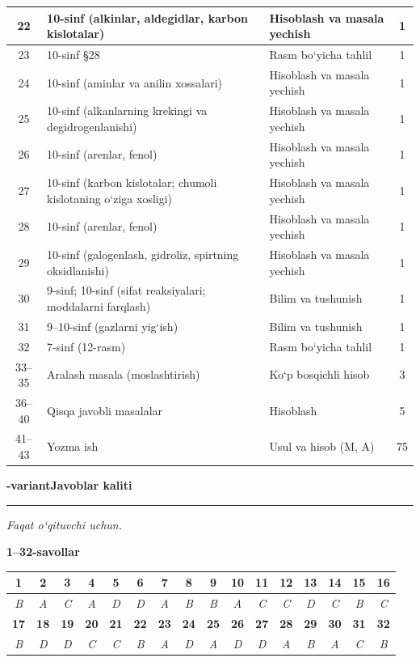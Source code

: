 \documentclass[11pt,a4paper]{article}
\newcommand{\hdrpill}[1]{\begin{tikzpicture}[baseline=0pt]\node[fill=ygreen,text=white,rounded corners=8pt,inner xsep=10pt,inner ysep=5pt,font=\fontsize{13}{15}\bfseries\selectfont] at (0,0.475){#1};\end{tikzpicture}}
\newcommand{\curvar}{}\fancyhead[R]{\hdrpill{\curvar}}
\begin{document}
{\begin{longtable}{|c|p{7.2cm}|p{5.4cm}|c|}
22 & 10-sinf (alkinlar, aldegidlar, karbon kislotalar) & Hisoblash va masala yechish & 1\\\hline
23 & 10-sinf \S{}28 & Rasm bo`yicha tahlil & 1\\\hline
24 & 10-sinf (aminlar va anilin xossalari) & Hisoblash va masala yechish & 1\\\hline
25 & 10-sinf (alkanlarning krekingi va degidrogenlanishi) & Hisoblash va masala yechish & 1\\\hline
26 & 10-sinf (arenlar, fenol) & Hisoblash va masala yechish & 1\\\hline
27 & 10-sinf (karbon kislotalar; chumoli kislotaning o`ziga xosligi) & Hisoblash va masala yechish & 1\\\hline
28 & 10-sinf (arenlar, fenol) & Hisoblash va masala yechish & 1\\\hline
29 & 10-sinf (galogenlash, gidroliz, spirtning oksidlanishi) & Hisoblash va masala yechish & 1\\\hline
30 & 9-sinf; 10-sinf (sifat reaksiyalari; moddalarni farqlash) & Bilim va tushunish & 1\\\hline
31 & 9--10-sinf (gazlarni yig`ish) & Bilim va tushunish & 1\\\hline
32 & 7-sinf (12-rasm) & Rasm bo`yicha tahlil & 1\\\hline
33--35 & Aralash masala (moslashtirish) & Ko`p bosqichli hisob & 3\\\hline
36--40 & Qisqa javobli masalalar & Hisoblash & 5\\\hline
41--43 & Yozma ish & Usul va hisob (M, A) & 75\\\hline
\end{longtable}}
\renewcommand{\curvar}{Javoblar}
\newpage
\noindent\textbf{\fontsize{13}{15}-variant}\hfill \textbf{Javoblar kaliti}\par\smallskip\hrule\smallskip
\textit{Faqat o`qituvchi uchun.}\par\medskip
\noindent\textbf{1--32-savollar}\par\smallskip
\noindent\begin{tabular}{|c|c|c|c|c|c|c|c|c|c|c|c|c|c|c|c|}\hline
\textbf{1} & \textbf{2} & \textbf{3} & \textbf{4} & \textbf{5} & \textbf{6} & \textbf{7} & \textbf{8} & \textbf{9} & \textbf{10} & \textbf{11} & \textbf{12} & \textbf{13} & \textbf{14} & \textbf{15} & \textbf{16}\\\hline
\textsl{B} & \textsl{A} & \textsl{C} & \textsl{A} & \textsl{D} & \textsl{D} & \textsl{A} & \textsl{B} & \textsl{B} & \textsl{A} & \textsl{C} & \textsl{C} & \textsl{D} & \textsl{C} & \textsl{B} & \textsl{C}\\\hline
\textbf{17} & \textbf{18} & \textbf{19} & \textbf{20} & \textbf{21} & \textbf{22} & \textbf{23} & \textbf{24} & \textbf{25} & \textbf{26} & \textbf{27} & \textbf{28} & \textbf{29} & \textbf{30} & \textbf{31} & \textbf{32}\\\hline
\textsl{B} & \textsl{D} & \textsl{D} & \textsl{C} & \textsl{C} & \textsl{B} & \textsl{A} & \textsl{D} & \textsl{A} & \textsl{D} & \textsl{D} & \textsl{A} & \textsl{B} & \textsl{A} & \textsl{C} & \textsl{B}\\\hline
\end{tabular}\par\medskip
\end{document}
